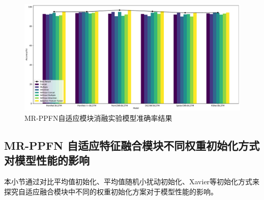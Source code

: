 \begin{figure}[htbp]
    \centering
    \includegraphics[width=1\linewidth]{imgs/Adaptive_fusion_ablation_results.pdf}
    \caption{MR-PPFN自适应模块消融实验模型准确率结果}
    \label{fig:Adaptive_fusion_ablation_results}
\end{figure}

\subsection{ MR-PPFN 自适应特征融合模块不同权重初始化方式对模型性能的影响}
本小节通过对比平均值初始化、平均值随机小扰动初始化、Xavier等初始化方式来探究自适应融合模块中不同的权重初始化方案对于模型性能的影响。



